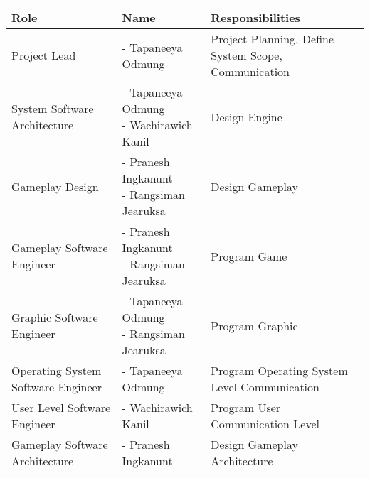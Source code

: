 \begin{minipage}{\textwidth}
    \begin{tabularx}{\textwidth}{|L|L|L|}
        \hline
        \textbf{Role} & \textbf{Name} & \textbf{Responsibilities} \\
        \hline
        Project Lead & - Tapaneeya Odmung & Project Planning, Define System Scope, Communication \\
        System Software Architecture & {- Tapaneeya Odmung \newline - Wachirawich Kanil} & Design Engine \\
        Gameplay Design & {- Pranesh Ingkanunt \newline - Rangsiman Jearuksa} & Design Gameplay \\
        Gameplay Software Engineer & {- Pranesh Ingkanunt \newline - Rangsiman Jearuksa} & Program Game \\
        Graphic Software Engineer & {- Tapaneeya Odmung \newline - Rangsiman Jearuksa} & Program Graphic \\
        Operating System Software Engineer & - Tapaneeya Odmung & Program Operating System Level Communication \\
        User Level Software Engineer & - Wachirawich Kanil & Program User Communication Level \\
        Gameplay Software Architecture & - Pranesh Ingkanunt & Design Gameplay Architecture \\
        \hline
    \end{tabularx}
\end{minipage}
\label{tab:role-name-responsibilities}